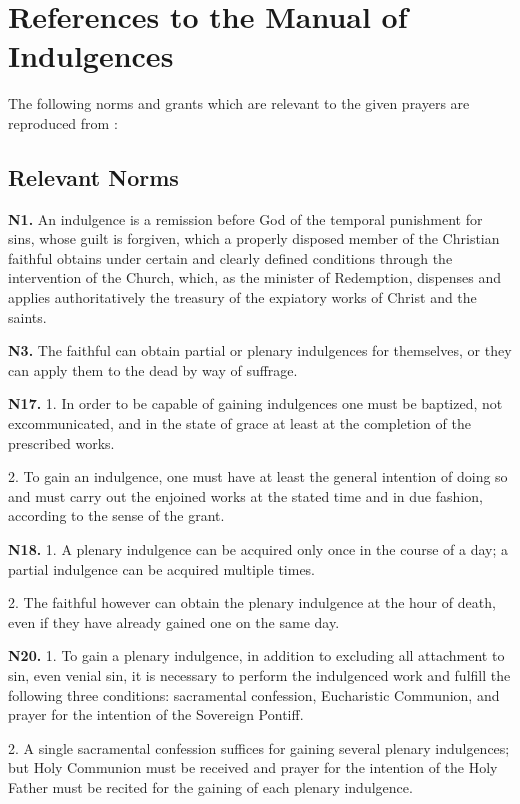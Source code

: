 \section{References to the Manual of Indulgences}
The following norms and grants which are relevant to the given prayers are reproduced from :
\subsection{Relevant Norms}
\newcommand{\norm}[1]{\textbf{N#1.}\newline}
\newcommand{\subnorm}[1]{\sectionsign{}#1.}
\norm{1}
An indulgence is a remission before God of the temporal punishment for sins, whose guilt is forgiven, which a properly disposed member of the Christian faithful obtains under certain and clearly defined conditions through the intervention of the Church, which, as the minister of Redemption, dispenses and applies authoritatively the treasury of the expiatory works of Christ and the saints.

\norm{3}
The faithful can obtain partial or plenary indulgences for themselves, or they can apply them to the dead by way of suffrage.

\norm{17}
\subnorm{1} In order to be capable of gaining indulgences one must be baptized, not excommunicated, and in the state of grace at least at the completion of the prescribed works.

\subnorm{2} To gain an indulgence, one must have at least the general intention of doing so and must carry out the enjoined works at the stated time and in due fashion, according to the sense of the grant.

\norm{18}
\subnorm{1} A plenary indulgence can be acquired only once in the course of a day; a partial indulgence can be acquired multiple times.

\subnorm{2} The faithful however can obtain the plenary indulgence at the hour of death, even if they have already gained one on the same day.

\norm{20}
\subnorm{1} To gain a plenary indulgence, in addition to excluding all attachment to sin, even venial sin, it is necessary to perform the indulgenced work and fulfill the following three conditions:
sacramental confession, Eucharistic Communion, and prayer for the intention of the Sovereign Pontiff.

\subnorm{2} A single sacramental confession suffices for gaining several plenary indulgences;
but Holy Communion must be received and prayer for the intention of the Holy Father must be recited for the gaining of each plenary indulgence.

